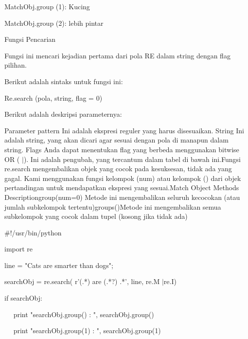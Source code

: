 \noindent 
MatchObj.group (1): Kucing \par
\noindent 
MatchObj.group (2): lebih pintar \par
\vspace{12pt}
Fungsi Pencarian \par
\vspace{12pt}
Fungsi ini mencari kejadian pertama dari pola RE dalam string dengan flag pilihan. \par
\vspace{12pt}
Berikut adalah sintaks untuk fungsi ini: \par
\vspace{12pt}
Re.search (pola, string, flag = 0) \par
\vspace{12pt}
\noindent 
Berikut adalah deskripsi parameternya: \par
Parameter pattern Ini adalah ekspresi reguler yang harus disesuaikan. String Ini adalah string, yang akan dicari agar sesuai dengan pola di manapun dalam string. Flags Anda dapat menentukan flag yang berbeda menggunakan bitwise OR ( $  \vert  $). Ini adalah pengubah, yang tercantum dalam tabel di bawah ini.Fungsi re.search mengembalikan objek yang cocok pada kesuksesan, tidak ada yang gagal. Kami menggunakan fungsi kelompok (num) atau kelompok () dari objek pertandingan untuk mendapatkan ekspresi yang sesuai.Match Object Methods Descriptiongroup(num=0) Metode ini mengembalikan seluruh kecocokan (atau jumlah subkelompok tertentu)groups()Metode ini mengembalikan semua subkelompok yang cocok dalam tupel (kosong jika tidak ada) \par
\vspace{12pt}
\vspace{12pt}
\noindent 
 $  \#  $!/usr/bin/python \par
\noindent 
import re \par
\vspace{12pt}
\noindent 
line = "Cats are smarter than dogs"; \par
\vspace{12pt}
\noindent 
searchObj = re.search( r'(.*) are (.*?) .*', line, re.M $  \vert  $re.I) \par
\vspace{12pt}
\noindent 
if searchObj: \par
\noindent 
~~ print "searchObj.group() : ", searchObj.group() \par
\noindent 
~~ print "searchObj.group(1) : ", searchObj.group(1) \par
\noindent 
